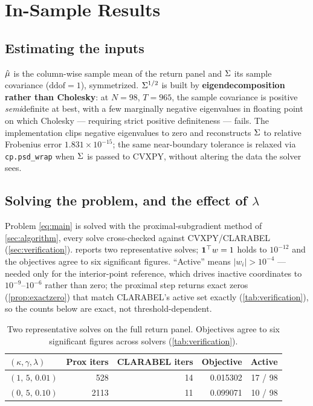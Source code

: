 \section{In-Sample Results}\label{sec:insample}

\subsection{Estimating the inputs}

$\hat{\mu}$ is the column-wise sample mean of the return panel and $\Sigma$ its sample covariance
($\text{ddof} = 1$), symmetrized. $\Sigma^{1/2}$ is built by \textbf{eigendecomposition rather than
Cholesky}: at $N=98$, $T=965$, the sample covariance is positive \emph{semi}definite at best, with
a few marginally negative eigenvalues in floating point on which Cholesky --- requiring strict
positive definiteness --- fails. The implementation clips negative eigenvalues to zero and
reconstructs $\Sigma$ to relative Frobenius error $1.831\times10^{-15}$; the same near-boundary
tolerance is relaxed via \texttt{cp.psd\_wrap} when $\Sigma$ is passed to CVXPY, without altering the
data the solver sees.

\subsection{Solving the problem, and the effect of $\lambda$}

Problem \cref{eq:main} is solved with the proximal-subgradient method of \cref{sec:algorithm},
every solve cross-checked against CVXPY/CLARABEL (\cref{sec:verification}). 
reports two representative solves; $\mathbf{1}^\top w = 1$ holds to $10^{-12}$ and the objectives agree
to six significant figures. ``Active'' means $|w_i| > 10^{-4}$ --- needed only for the
interior-point reference, which drives inactive coordinates to $10^{-9}$--$10^{-6}$ rather than
zero; the proximal step returns exact zeros (\cref{prop:exactzero}) that match CLARABEL's active
set exactly (\cref{tab:verification}), so the counts below are exact, not threshold-dependent.

\begin{table}[htbp]
\centering
\caption{Two representative solves on the full return panel. Objectives agree to six significant
figures across solvers (\cref{tab:verification}).}
\label{tab:demo}
\small
\begin{tabular}{@{}lrrrr@{}}
\toprule
$(\kappa,\gamma,\lambda)$ & Prox iters & CLARABEL iters & Objective & Active \\
\midrule
$(1,\, 5,\, 0.01)$ & 528  & 14 & 0.015302 & 17 / 98 \\
$(0,\, 5,\, 0.10)$ & 2113 & 11 & 0.099071 & 10 / 98 \\
\bottomrule
\end{tabular}
\end{table}

